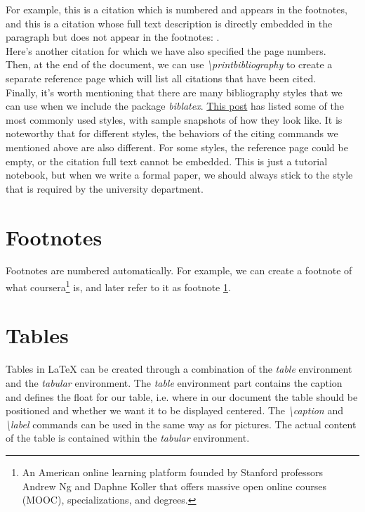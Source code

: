 \documentclass[11pt]{article}  %
\begin{document}
      For example, this is a citation \autocite{ab94} which is numbered and appears in the footnotes, and this is a citation whose full text description is directly embedded in the paragraph but does not appear in the footnotes: \cite{ahu61}.\\

      Here's another citation \autocite[32-35]{fk1988}  %
      for which we have also specified the page numbers.\\

      Then, at the end of the document, we can use \textit{\textbackslash printbibliography} to create a separate reference page which will list all citations that have been cited.\\

      Finally, it's worth mentioning that there are many bibliography styles that we can use when we include the package \textit{biblatex}. \href{https://www.overleaf.com/learn/latex/Biblatex_bibliography_styles}{This post} has listed some of the most commonly used styles, with sample snapshots of how they look like. It is noteworthy that for different styles, the behaviors of the citing commands we mentioned above are also different. For some styles, the reference page could be empty, or the citation full text cannot be embedded. This is just a tutorial notebook, but when we write a formal paper, we should always stick to the style that is required by the university department.


  \section{Footnotes}
    Footnotes are numbered automatically. For example, we can create a footnote of what coursera\footnote{\label{coursera}An American online learning platform founded by Stanford professors Andrew Ng and Daphne Koller that offers massive open online courses (MOOC), specializations, and degrees.} is, and later refer to it as footnote \ref{coursera}.


  \section{Tables}
    Tables in LaTeX can be created through a combination of the \textit{table} environment and the \textit{tabular} environment. The \textit{table} environment part contains the caption and defines the float for our table, i.e. where in our document the table should be positioned and whether we want it to be displayed centered. The \textit{\textbackslash caption} and \textit{\textbackslash label} commands can be used in the same way as for pictures. The actual content of the table is contained within the \textit{tabular} environment.\\
\end{document}
